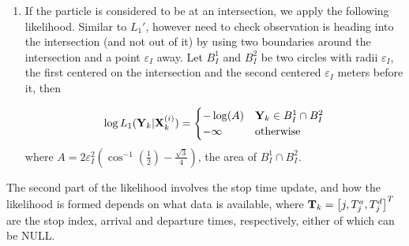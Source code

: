 \documentclass[draftcls,a4paper,onecolumn]{IEEEtran}\usepackage[]{graphicx}\usepackage[]{color}
\begin{document}
\begin{enumerate}
\item
If the particle is considered to be at an intersection, we apply the following likelihood.
Similar to $L_1'$, however need to check observation is heading into the intersection
(and not out of it) by using two boundaries around the intersection and a point $\varepsilon_I$ away.
Let $B_I^1$ and $B_I^2$ be two circles with radii $\varepsilon_I$,
the first centered on the intersection and the second centered $\varepsilon_I$ meters before it, then

\begin{equation}
  \label{eq:l1c}
  \log L_1 (\mathbf{Y}_k | \mathbf{X}_k^{(i)}) =
  \begin{cases}
    - \log(A) & \mathbf{Y}_k \in B_I^1 \cap B_I^2 \\
    - \infty & \text{otherwise}
  \end{cases}
\end{equation}
where $A = 2\varepsilon_I^2 \left( \cos^{-1}(\frac{1}{2}) - \frac{\sqrt{3}}{4} \right)$,
the area of $B_I^1\cap B_I^2$.

\end{enumerate}



The second part of the likelihood involves the stop time update,
and how the likelihood is formed depends on what data is available,
where $\mathbf{T}_k = \left[ j, T^a_j , T^d_j \right]^T$ 
are the stop index, arrival and departure times,
respectively, either of which can be NULL.
\end{document}
